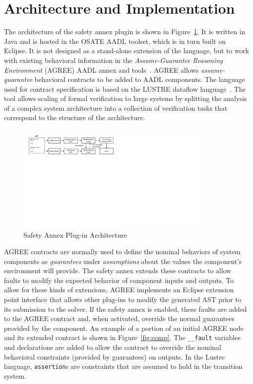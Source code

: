 \section{Architecture and Implementation}


The architecture of the safety annex plugin is shown in Figure~\ref{fig:plugin-arch}.  It is written in Java and is hosted in the OSATE AADL toolset, which is in turn built on Eclipse.  It is not designed as a stand-alone extension of the language, but to work with existing behavioral information in the {\em Assume-Guarantee Reasoning Environment} (AGREE) AADL annex and tools~\cite{NFM2012:CoGaMiWhLaLu}.  AGREE allows {\em assume-guarantee} behavioral contracts to be added to AADL components.  The language used for contract specification is based on the LUSTRE dataflow language~\cite{Halbwachs91:IEEE}. The tool allows scaling of formal verification to large systems by splitting the analysis of a complex system architecture into a collection of verification tasks that correspond to the structure of the architecture.

\begin{figure}
\begin{center}
\includegraphics[trim=0 400 430 0,clip,width=0.85\textwidth]{images/arch.png}
\end{center}
\vspace{-0.2in}
\caption{Safety Annex Plug-in Architecture}
\label{fig:plugin-arch}
\end{figure}

AGREE contracts are normally used to define the nominal behaviors of system components as {\em guarantees} under {\em assumptions} about the values the component's environment will provide.  The safety annex extends these contracts to allow faults to modify the expected behavior of component inputs and outputs.  To allow for these kinds of extensions, AGREE implements an Eclipse extension point interface that allows other plug-ins to modify the generated AST prior to its submission to the solver.  If the safety annex is enabled, these faults are added to the AGREE contract and, when activated, override the normal guarantees provided by the component.  An example of a portion of an initial AGREE node and its extended contract is shown in Figure~\ref{fig:comp}.  The \texttt{\_\_fault} variables and declarations are added to allow the contract to override the nominal behavioral constraints (provided by guarantees) on outputs.  In the Lustre language, \texttt{assertion}s are constraints that are assumed to hold in the transition system.

